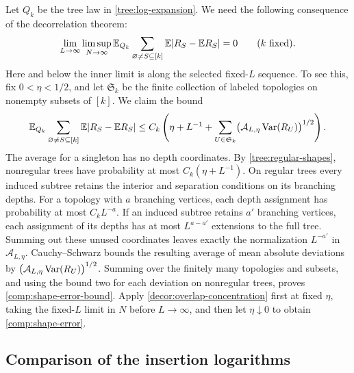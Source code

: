 Let $Q_k$ be the tree law in \cref{tree:log-expansion}. We need the following
consequence of the decorrelation theorem:
\begin{equation}\label{comp:shape-error}
 \lim_{L\to\infty}\limsup_{N\to\infty}
 \mathbb E_{Q_k}\sum_{\varnothing\ne S\subseteq[k]}
 \mathbb E|R_S-\mathbb E R_S|=0\qquad(k\text{ fixed}).
\end{equation}
Here and below the inner limit is along the selected fixed-$L$ sequence.
To see this, fix $0<\eta<1/2$, and let $\mathfrak S_k$ be the finite collection
of labeled topologies on nonempty subsets of $[k]$. We claim the bound
\begin{equation}\label{comp:shape-error-bound}
 \mathbb E_{Q_k}\sum_{\varnothing\ne S\subseteq[k]}
       \mathbb E|R_S-\mathbb E R_S|
 \le C_k\left(\eta+L^{-1}
       +\sum_{U\in\mathfrak S_k}
          \bigl(\mathcal A_{L,\eta}\operatorname{Var}(R_U)\bigr)^{1/2}\right).
\end{equation}
The average for a singleton has no depth coordinates.
By \cref{tree:regular-shapes}, nonregular trees
have probability at most $C_k(\eta+L^{-1})$. On regular trees every induced
subtree retains the interior and separation conditions on its branching
depths. For a topology with $a$ branching vertices, each depth assignment
has probability at most $C_kL^{-a}$. If an induced subtree retains $a'$
branching vertices, each assignment of its depths has at most $L^{a-a'}$
extensions to the full tree. Summing out these unused coordinates leaves
exactly the normalization $L^{-a'}$ in $\mathcal A_{L,\eta}$.
Cauchy--Schwarz bounds the resulting average of mean absolute deviations
by $\bigl(\mathcal A_{L,\eta}\operatorname{Var}(R_U)\bigr)^{1/2}$.
Summing over the finitely many topologies and subsets, and using the bound
two for each deviation on nonregular trees, proves
\eqref{comp:shape-error-bound}. Apply \cref{decor:overlap-concentration}
first at fixed $\eta$, taking the fixed-$L$ limit in $N$ before
$L\to\infty$, and then let $\eta\downarrow0$ to obtain
\eqref{comp:shape-error}.

\subsection{Comparison of the insertion logarithms}


